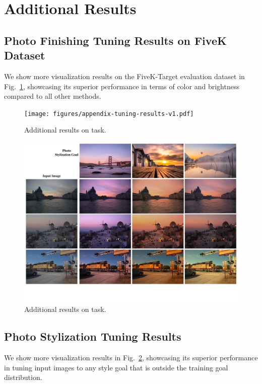 \appendix

\section{Additional Results}




\subsection{Photo Finishing Tuning Results on FiveK Dataset}
\label{sec:appen_a2}
We show more \taskPFT visualization results on the FiveK-Target evaluation dataset in Fig.~\ref{fig:pft_vis_supp}, showcasing its superior performance in terms of color and brightness compared to all other methods.
\begin{figure}[ht]
\centering
  \texttt{[image: figures/appendix-tuning-results-v1.pdf]}
  \caption{Additional results on \taskPFT task.}
  \label{fig:pft_vis_supp}
\end{figure}

\begin{figure}[ht]
\centering
  \includegraphics[width=\textwidth]{figures/fig_vis_style_supp.pdf}
  \caption{Additional results on \taskPST task.}
  \label{fig:pst_vis_supp}
\end{figure}
 
\subsection{Photo Stylization Tuning Results}
\label{sec:appen_a3}
We show more \taskPST visualization results in Fig.~\ref{fig:pst_vis_supp}, showcasing its superior performance in tuning input images to any style goal that is outside the training goal distribution. 



